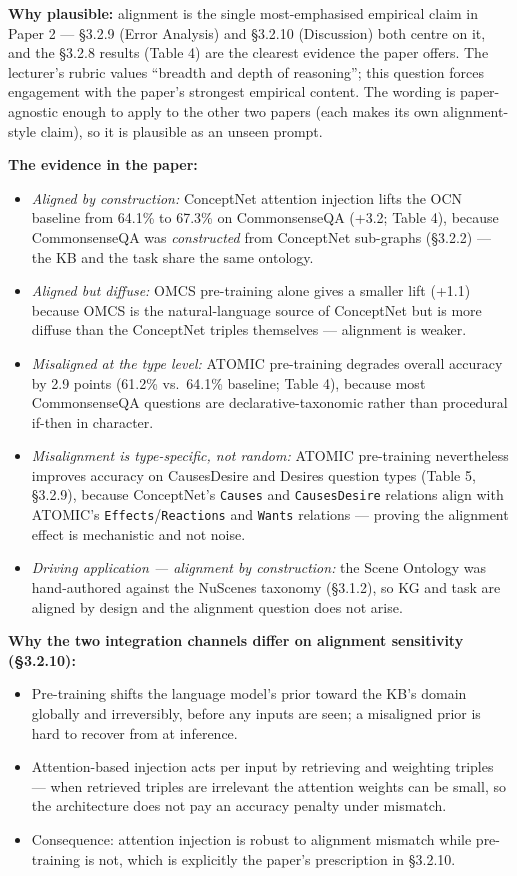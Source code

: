\documentclass[11pt, a4paper]{article}
\begin{document}
\textbf{Why plausible:} alignment is the single most-emphasised empirical claim in Paper 2 — §3.2.9 (Error Analysis) and §3.2.10 (Discussion) both centre on it, and the §3.2.8 results (Table 4) are the clearest evidence the paper offers. The lecturer's rubric values ``breadth and depth of reasoning''; this question forces engagement with the paper's strongest empirical content. The wording is paper-agnostic enough to apply to the other two papers (each makes its own alignment-style claim), so it is plausible as an unseen prompt.

\textbf{The evidence in the paper:}
\begin{itemize}
  \item \emph{Aligned by construction:} ConceptNet attention injection lifts the OCN baseline from 64.1\% to 67.3\% on CommonsenseQA (+3.2; Table 4), because CommonsenseQA was \emph{constructed} from ConceptNet sub-graphs (§3.2.2) — the KB and the task share the same ontology.
  \item \emph{Aligned but diffuse:} OMCS pre-training alone gives a smaller lift (+1.1) because OMCS is the natural-language source of ConceptNet but is more diffuse than the ConceptNet triples themselves — alignment is weaker.
  \item \emph{Misaligned at the type level:} ATOMIC pre-training degrades overall accuracy by 2.9 points (61.2\% vs.\ 64.1\% baseline; Table 4), because most CommonsenseQA questions are declarative-taxonomic rather than procedural if-then in character.
  \item \emph{Misalignment is type-specific, not random:} ATOMIC pre-training nevertheless improves accuracy on CausesDesire and Desires question types (Table 5, §3.2.9), because ConceptNet's \texttt{Causes} and \texttt{CausesDesire} relations align with ATOMIC's \texttt{Effects}/\texttt{Reactions} and \texttt{Wants} relations — proving the alignment effect is mechanistic and not noise.
  \item \emph{Driving application — alignment by construction:} the Scene Ontology was hand-authored against the NuScenes taxonomy (§3.1.2), so KG and task are aligned by design and the alignment question does not arise.
\end{itemize}

\textbf{Why the two integration channels differ on alignment sensitivity (§3.2.10):}
\begin{itemize}
  \item Pre-training shifts the language model's prior toward the KB's domain globally and irreversibly, before any inputs are seen; a misaligned prior is hard to recover from at inference.
  \item Attention-based injection acts per input by retrieving and weighting triples — when retrieved triples are irrelevant the attention weights can be small, so the architecture does not pay an accuracy penalty under mismatch.
  \item Consequence: attention injection is robust to alignment mismatch while pre-training is not, which is explicitly the paper's prescription in §3.2.10.
\end{itemize}
\end{document}
